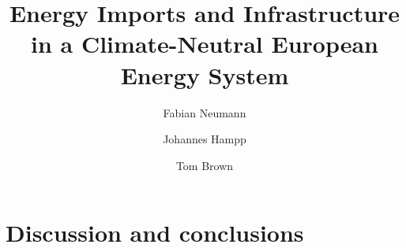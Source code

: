 \documentclass[5p,9pt]{elsarticle}
\begin{document}
\begin{frontmatter}

	\title{Energy Imports and Infrastructure in a Climate-Neutral European Energy System}
    
	\author[tub]{Fabian Neumann}
	\author[pik]{Johannes Hampp}
	\author[tub]{Tom Brown}
	
	\address[tub]{Department of Digital Transformation in Energy Systems, Institute of Energy Technology, Technische Universität Berlin, Fakultät III, Einsteinufer 25 (TA 8), 10587 Berlin, Germany}
	\address[pik]{Potsdam Institute for Climate Impact Research (PIK), Member of the Leibniz Association, P.O.~Box 60 12 03, 14412 Potsdam, Germany}

	\begin{abstract}
		
	\end{abstract}




\end{frontmatter}









\section*{Discussion and conclusions}
\label{sec:discussion}
\end{document}
